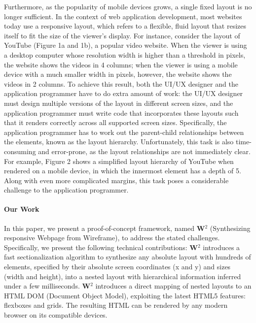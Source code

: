 \documentclass[runningheads]{llncs}
\newcommand{\W}{\textbf{W}$^2$ }
\begin{document}
Furthermore, as the popularity of mobile devices grows, a single fixed layout is no longer sufficient. In the context of web application development, most websites today use a responsive layout, which refers to a flexible, fluid layout that resizes itself to fit the size of the viewer's display. For instance, consider the layout of YouTube (Figure 1a and 1b), a popular video website. When the viewer is using a desktop computer whose resolution width is higher than a threshold in pixels, the website shows the videos in 4 columns; when the viewer is using a mobile device with a much smaller width in pixels, however, the website shows the videos in 2 columns. To achieve this result, both the UI/UX designer and the application programmer have to do extra amount of work: the UI/UX designer must design multiple versions of the layout in different screen sizes, and the application programmer must write code that incorporates these layouts such that it renders correctly across all supported screen sizes. Specifically, the application programmer has to work out the parent-child relationships between the elements, known as the layout hierarchy. Unfortunately, this task is also time-consuming and error-prone, as the layout relationships are not immediately clear. For example, Figure 2 shows a simplified layout hierarchy of YouTube when rendered on a mobile device, in which the innermost element has a depth of 5. Along with even more complicated margins, this task poses a considerable challenge to the application programmer.
\paragraph{Our Work} In this paper, we present a proof-of-concept framework, named \W (Synthesizing responsive Webpage from Wireframe), to address the stated challenges. Specifically, we present the following technical contributions:
\W introduces a fast sectionalization algorithm to synthesize any absolute layout with hundreds of elements, specified by their absolute screen coordinates (x and y) and sizes (width and height), into a nested layout with hierarchical information inferred under a few milliseconds.
\W introduces a direct mapping of nested layouts to an HTML DOM (Document Object Model), exploiting the latest HTML5 features: flexboxes and grids. The resulting HTML can be rendered by any modern browser on its compatible devices.
\end{document}
